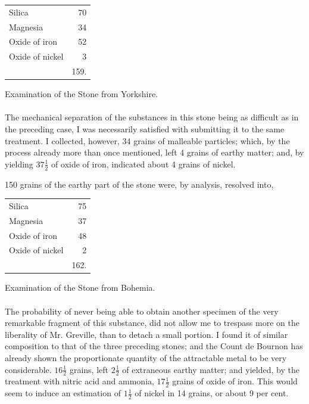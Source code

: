 \documentclass[a4paper, 12pt, oneside, twocolumn]{article}
\begin{document}
\begin{table}[H]
    \centering\bfseries
    \begin{tabular}{l r}
        Silica & 70 \\
        Magnesia & 34 \\
        Oxide of iron & 52 \\
        Oxide of nickel & 3 \\ \hline
        ~ & 159. \\
    \end{tabular}
\end{table}
\begin{center}
Examination of the Stone from Yorkshire.
\end{center}
\paragraph{}
The mechanical separation of the substances in this stone being as difficult as in the preceding case, I was necessarily satisfied with submitting it to the same treatment. I collected, however, 34 grains of malleable particles; which, by the process already more than once mentioned, left 4 grains of earthy matter; and, by yielding $37\frac{1}{2}$ of oxide of iron, indicated about 4 grains of nickel.

150 grains of the earthy part of the stone were, by analysis, resolved into,
\begin{table}[H]
    \centering\bfseries
    \begin{tabular}{l r}
        Silica & 75 \\
        Magnesia & 37 \\
        Oxide of iron & 48 \\
        Oxide of nickel & 2 \\ \hline
        ~ & 162. \\
    \end{tabular}
\end{table}
\begin{center}
Examination of the Stone from Bohemia.
\end{center}
\paragraph{}
The probability of never being able to obtain another specimen of the very remarkable fragment of this substance, did not allow me to trespass more on the liberality of Mr. Greville, than to detach a small portion. I found it of similar composition to that of the three preceding stones; and the Count de Bournon has already shown the proportionate quantity of the attractable metal to be very considerable. $16\frac{1}{2}$ grains, left $2\frac{1}{2}$ of extraneous earthy matter; and yielded, by the treatment with nitric acid and ammonia, $17\frac{1}{2}$ grains of oxide of iron. This would seem to induce an estimation of $1\frac{1}{2}$ of nickel in 14 grains, or about 9 per cent.
\end{document}
